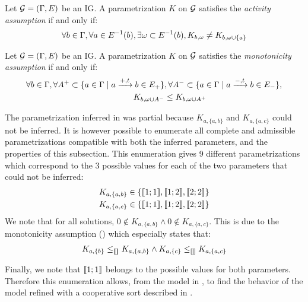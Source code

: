 \begin{property}
\label{pro:param_enum_activity}
Let $\mathcal{G} = (\Gamma, E)$ be an IG. A parametrization $K$ on $\mathcal{G}$ satisfies the \emph{activity assumption} if and only if:
\begin{align*}
  \forall b \in \Gamma, \forall a \in E^{-1}(b), \exists \omega \subset E^{-1}(b), K_{b,\omega} \neq K_{b,\omega \cup \{ a \}}
\end{align*}
\end{property}

\begin{property}
\label{pro:param_enum_monotonicity}
Let $\mathcal{G} = (\Gamma, E)$ be an IG. A parametrization $K$ on $\mathcal{G}$ satisfies the \emph{monotonicity assumption} if and only if:
\begin{align*}
  \forall b \in \Gamma,
  \forall A^+ \subset \{ a \in \Gamma \mid a \xrightarrow{+, t} b \in E_+ \}&,
  \forall A^- \subset \{ a \in \Gamma \mid a \xrightarrow{-, t} b \in E_- \},\\
  K_{b,\omega \cup A^-} & \leq K_{b,\omega \cup A^+}
\end{align*}
\end{property}

\begin{example}\label{ex:enum-param-runningPH-1}
The parametrization inferred in  was partial because $K_{a,\{a,b\}}$ and $K_{a,\{a,c\}}$ could not be inferred.
It is however possible to enumerate all complete and admissible parametrizations
compatible with both the inferred parameters, and the properties of this subsection.
This enumeration gives 9 different parametrizations which correspond to the 3 possible values
for each of the two parameters that could not be inferred:
\begin{align*}
  K_{a,\{a,b\}} &\in \{ \llbracket 1 ; 1 \rrbracket, \llbracket 1 ; 2 \rrbracket, \llbracket 2 ; 2 \rrbracket \} \\
  K_{a,\{a,c\}} &\in \{ \llbracket 1 ; 1 \rrbracket, \llbracket 1 ; 2 \rrbracket, \llbracket 2 ; 2 \rrbracket \}
\end{align*}
We note that for all solutions, $0 \notin K_{a,\{a,b\}} \wedge 0 \notin K_{a,\{a,c\}}$.
This is due to the monotonicity assumption () which especially states that:
\begin{align*}
  K_{a,\{b\}} \leq_{\llbracket\rrbracket} K_{a,\{a,b\}} \wedge
  K_{a,\{c\}} \leq_{\llbracket\rrbracket} K_{a,\{a,c\}}
\end{align*}

Finally, we note that $\llbracket 1 ; 1 \rrbracket$ belongs to the possible values for both parameters.
Therefore this enumeration allows, from the model in ,
to find the behavior of the model refined with a cooperative sort described in .
\end{example}
